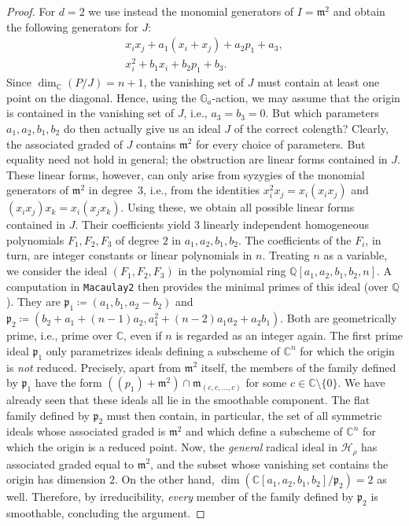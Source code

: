 \documentclass[11pt]{amsart}
\theoremstyle{definition}
\newcommand{\QQ}{\mathbb{Q}}
\newcommand{\CC}{\mathbb{C}}
\newcommand{\mm}{\mathfrak{m}}
\newcommand{\HH}{\mathcal{H}}
\begin{document}
\begin{proof}
\medskip
For $d=2$ we use instead the monomial generators of $I = \mm^2$ and obtain the following generators for $J$:
\begin{gather*}
    x_i x_j + a_1 (x_i + x_j) + a_2 p_1 + a_3, \\
    x_i^2 + b_1 x_i + b_2 p_1 + b_3.
\end{gather*}
Since $\dim_\CC(P/J) = n+1$, the vanishing set of $J$ must contain at least one point on the diagonal. Hence, using the $\mathbb{G}_a$-action, we may assume that the origin is contained in the vanishing set of $J$, i.e., $a_3 = b_3 = 0$. But which parameters $a_1,a_2,b_1,b_2$ do then actually give us an ideal $J$ of the correct colength? Clearly, the associated graded of $J$ contains $\mm^2$ for every choice of parameters. But equality need not hold in general; the obstruction are linear forms contained in $J$. These linear forms, however, can only arise from syzygies of the monomial generators of $\mm^2$ in degree~$3$, i.e., from the identities $x_i^2 x_j = x_i (x_i x_j)$ and $(x_i x_j) x_k = x_i (x_j x_k)$. Using these, we obtain all possible linear forms contained in $J$. Their coefficients yield $3$ linearly independent homogeneous polynomials $F_1,F_2,F_3$ of degree $2$ in $a_1,a_2,b_1,b_2$. The coefficients of the $F_i$, in turn, are integer constants or linear polynomials in $n$. Treating $n$ as a variable, we consider the ideal $(F_1,F_2,F_3)$ in the polynomial ring $\QQ[a_1,a_2,b_1,b_2,n]$. A computation in \texttt{Macaulay2} then provides the minimal primes of this ideal (over $\QQ$). They are $\mathfrak{p}_1 \coloneqq (a_1,b_1,a_2-b_2)$ and $\mathfrak{p}_2 \coloneqq (b_2+a_1+(n-1)a_2, a_1^2 + (n-2)a_1 a_2 + a_2 b_1)$. Both are geometrically prime, i.e., prime over $\CC$, even if $n$ is regarded as an integer again. The first prime ideal $\mathfrak{p}_1$ only parametrizes ideals defining a subscheme of $\CC^n$ for which the origin is \emph{not} reduced. Precisely, apart from $\mm^2$ itself, the members of the family defined by $\mathfrak{p}_1$ have the form $((p_1) + \mm^2) \cap \mm_{(c,c,\ldots,c)}$ for some $c \in \CC \setminus \{0\}$. We have already seen that these ideals all lie in the smoothable component.
The flat family defined by $\mathfrak{p}_2$ must then contain, in particular, the set of all symmetric ideals whose associated graded is $\mm^2$ and which define a subscheme of $\CC^n$ for which the origin is a reduced point. Now, the \emph{general} radical ideal in $\HH_\rho$ has associated graded equal to $\mm^2$, and the subset whose vanishing set contains the origin has dimension $2$. On the other hand, $\dim(\CC[a_1,a_2,b_1,b_2]/\mathfrak{p}_2) = 2$ as well. Therefore, by irreducibility, \emph{every} member of the family defined by $\mathfrak{p}_2$ is smoothable, concluding the argument.


\end{proof}
\end{document}
